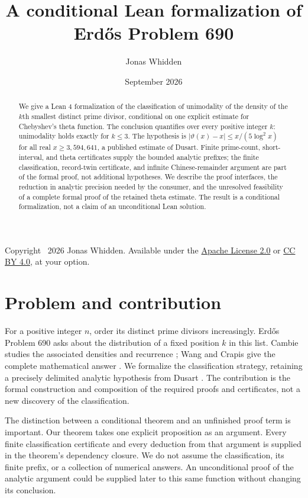 \documentclass[11pt]{amsart}
\title{A conditional Lean formalization of Erd\H{o}s Problem 690}
\author{Jonas Whidden}
\date{September 2026}
\theoremstyle{definition}
\begin{document}
\begin{abstract}
We give a Lean 4 formalization of the classification of unimodality of the
density of the $k$th smallest distinct prime divisor, conditional on one
explicit estimate for Chebyshev's theta function. The conclusion quantifies
over every positive integer $k$: unimodality holds exactly for $k\leq3$.
The hypothesis is $|\vartheta(x)-x|\leq x/(5\log^2x)$ for all real
$x\geq3{,}594{,}641$, a published estimate of Dusart. Finite prime-count,
short-interval, and theta certificates supply the bounded analytic prefixes;
the finite classification, record-twin certificate, and infinite
Chinese-remainder argument are part of the formal proof, not additional
hypotheses. We describe the proof interfaces, the reduction in analytic
precision needed by the consumer, and the unresolved feasibility of a
complete formal proof of the retained theta estimate. The result is a
conditional formalization, not a claim of an unconditional Lean solution.
\end{abstract}
\maketitle
\begin{center}\small
Copyright \textcopyright\ 2026 Jonas Whidden. Available under the
\href{https://www.apache.org/licenses/LICENSE-2.0}{Apache License 2.0} or
\href{https://creativecommons.org/licenses/by/4.0/}{CC BY 4.0}, at your option.
\end{center}

\section{Problem and contribution}
For a positive integer $n$, order its distinct prime divisors increasingly.
Erd\H{o}s Problem 690 asks about the distribution of a fixed position $k$ in
this list. Cambie studies the associated densities and recurrence
\cite{Cambie}; Wang and Crapis give the complete mathematical answer
\cite{WangCrapis}. We formalize the classification strategy, retaining a
precisely delimited analytic hypothesis from Dusart \cite{Dusart}.
The contribution is the formal construction and composition of the required
proofs and certificates, not a new discovery of the classification.

The distinction between a conditional theorem and an unfinished proof term
is important. Our theorem takes one explicit proposition as an argument.
Every finite classification certificate and every deduction from that
argument is supplied in the theorem's dependency closure. We do not assume
the classification, its finite prefix, or a collection of numerical answers.
An unconditional proof of the analytic argument could be supplied later to
this same function without changing its conclusion.
\end{document}
